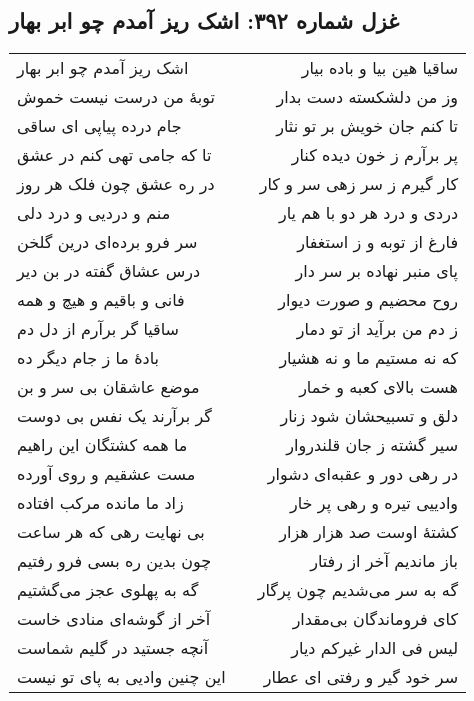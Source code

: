 \begin{center}
\section*{غزل شماره ۳۹۲: اشک ریز آمدم چو ابر بهار}
\label{sec:392}
\begin{longtable}{l p{0.5cm} r}
اشک ریز آمدم چو ابر بهار
&&
ساقیا هین بیا و باده بیار
\\
توبهٔ من درست نیست خموش
&&
وز من دلشکسته دست بدار
\\
جام درده پیاپی ای ساقی
&&
تا کنم جان خویش بر تو نثار
\\
تا که جامی تهی کنم در عشق
&&
پر برآرم ز خون دیده کنار
\\
در ره عشق چون فلک هر روز
&&
کار گیرم ز سر زهی سر و کار
\\
منم و دردیی و درد دلی
&&
دردی و درد هر دو با هم یار
\\
سر فرو برده‌ای درین گلخن
&&
فارغ از توبه و ز استغفار
\\
درس عشاق گفته در بن دیر
&&
پای منبر نهاده بر سر دار
\\
فانی و باقیم و هیچ و همه
&&
روح محضیم و صورت دیوار
\\
ساقیا گر برآرم از دل دم
&&
ز دم من برآید از تو دمار
\\
بادهٔ ما ز جام دیگر ده
&&
که نه مستیم ما و نه هشیار
\\
موضع عاشقان بی سر و بن
&&
هست بالای کعبه و خمار
\\
گر برآرند یک نفس بی دوست
&&
دلق و تسبیحشان شود زنار
\\
ما همه کشتگان این راهیم
&&
سیر گشته ز جان قلندروار
\\
مست عشقیم و روی آورده
&&
در رهی دور و عقبه‌ای دشوار
\\
زاد ما مانده مرکب افتاده
&&
وادییی تیره و رهی پر خار
\\
بی نهایت رهی که هر ساعت
&&
کشتهٔ اوست صد هزار هزار
\\
چون بدین ره بسی فرو رفتیم
&&
باز ماندیم آخر از رفتار
\\
گه به پهلوی عجز می‌گشتیم
&&
گه به سر می‌شدیم چون پرگار
\\
آخر از گوشه‌ای منادی خاست
&&
کای فروماندگان بی‌مقدار
\\
آنچه جستید در گلیم شماست
&&
لیس فی الدار غیرکم دیار
\\
این چنین وادیی به پای تو نیست
&&
سر خود گیر و رفتی ای عطار
\\
\end{longtable}
\end{center}
